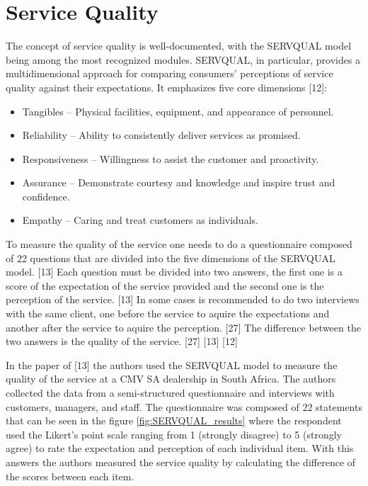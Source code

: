 \section{Service Quality}
The concept of service quality is well-documented, with the SERVQUAL model being among the most recognized modules. 
SERVQUAL, in particular, provides a multidimensional approach for comparing consumers’ perceptions of service quality against their expectations. 
It emphasizes five core dimensions [12]:

\begin{itemize}
  \item Tangibles – Physical facilities, equipment, and appearance of personnel.
  \item Reliability – Ability to consistently deliver services as promised.
  \item Responsiveness – Willingness to assist the customer and proactivity.
  \item Assurance – Demonstrate courtesy and knowledge and inspire trust and confidence.
  \item Empathy – Caring and treat customers as individuals.
\end{itemize}

To measure the quality of the service one needs to do a questionnaire composed of 22 questions that are divided into the five dimensions of the SERVQUAL model. [13]
Each question must be divided into two answers, the first one is a score of the expectation of the service provided and the second one is the perception of the service. [13]
In some cases is recommended to do two interviews with the same client, one before the service to aquire the expectations and another after the service to aquire the perception. [27]
The difference between the two answers is the quality of the service. [27] [13] [12]

In the paper of [13] the authors used the SERVQUAL model to measure the quality of the service at a CMV SA dealership in South Africa.
The authors collected the data from a semi-structured questionnaire and interviews with customers, managers, and staff.
The questionnaire was composed of 22 statements that can be seen in the figure \ref{fig:SERVQUAL_results} where the respondent used the Likert’s point scale ranging from 1 (strongly disagree) to 5 (strongly agree) to rate the expectation and perception of each individual item.
With this answers the authors measured the service quality by calculating the difference of the scores between each item.
 
